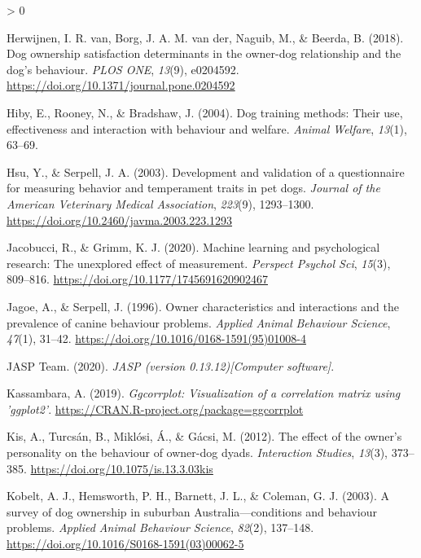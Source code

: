 \documentclass[
  english,
  ,pub,floatsintext]{apa6}
\newlength{\cslhangindent}
\newenvironment{CSLReferences}[2] %
 {%
  \setlength{\parindent}{0pt}
  \ifodd #1 \everypar{\setlength{\hangindent}{\cslhangindent}}\ignorespaces\fi
  \ifnum #2 > 0
  \setlength{\parskip}{#2\baselineskip}
  \fi
 }%
 {}
\begin{document}
\begin{CSLReferences}{1}{0}
\leavevmode\hypertarget{ref-Herwijnen.etal.2018}{}%
Herwijnen, I. R. van, Borg, J. A. M. van der, Naguib, M., \& Beerda, B. (2018). Dog ownership satisfaction determinants in the owner-dog relationship and the dog's behaviour. \emph{PLOS ONE}, \emph{13}(9), e0204592. \url{https://doi.org/10.1371/journal.pone.0204592}

\leavevmode\hypertarget{ref-Hiby.etal.2004}{}%
Hiby, E., Rooney, N., \& Bradshaw, J. (2004). Dog training methods: Their use, effectiveness and interaction with behaviour and welfare. \emph{Animal Welfare}, \emph{13}(1), 63--69.

\leavevmode\hypertarget{ref-Hsu.Serpell.2003}{}%
Hsu, Y., \& Serpell, J. A. (2003). Development and validation of a questionnaire for measuring behavior and temperament traits in pet dogs. \emph{Journal of the American Veterinary Medical Association}, \emph{223}(9), 1293--1300. \url{https://doi.org/10.2460/javma.2003.223.1293}

\leavevmode\hypertarget{ref-Jacobucci.Grimm.2020}{}%
Jacobucci, R., \& Grimm, K. J. (2020). Machine learning and psychological research: {The} unexplored effect of measurement. \emph{Perspect Psychol Sci}, \emph{15}(3), 809--816. \url{https://doi.org/10.1177/1745691620902467}

\leavevmode\hypertarget{ref-Jagoe.Serpell.1996}{}%
Jagoe, A., \& Serpell, J. (1996). Owner characteristics and interactions and the prevalence of canine behaviour problems. \emph{Applied Animal Behaviour Science}, \emph{47}(1), 31--42. \url{https://doi.org/10.1016/0168-1591(95)01008-4}

\leavevmode\hypertarget{ref-JASPTeam.2020}{}%
JASP Team. (2020). \emph{{JASP} (version 0.13.12){[}{Computer} software{]}}.

\leavevmode\hypertarget{ref-R-ggcorrplot}{}%
Kassambara, A. (2019). \emph{Ggcorrplot: Visualization of a correlation matrix using 'ggplot2'}. \url{https://CRAN.R-project.org/package=ggcorrplot}

\leavevmode\hypertarget{ref-Kis.etal.2012}{}%
Kis, A., Turcsán, B., Miklósi, Á., \& Gácsi, M. (2012). The effect of the owner's personality on the behaviour of owner-dog dyads. \emph{Interaction Studies}, \emph{13}(3), 373--385. \url{https://doi.org/10.1075/is.13.3.03kis}

\leavevmode\hypertarget{ref-Kobelt.etal.2003a}{}%
Kobelt, A. J., Hemsworth, P. H., Barnett, J. L., \& Coleman, G. J. (2003). A survey of dog ownership in suburban {Australia}---conditions and behaviour problems. \emph{Applied Animal Behaviour Science}, \emph{82}(2), 137--148. \url{https://doi.org/10.1016/S0168-1591(03)00062-5}


\end{CSLReferences}
\end{document}
